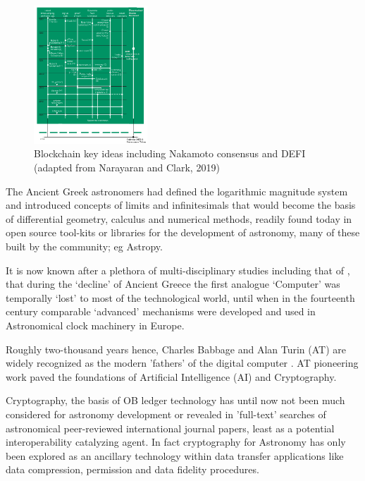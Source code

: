 \documentclass[final,5p,times,twocolumn,authoryear]{elsarticle}
\begin{document}
 \begin{figure}
    \centering
    \includegraphics[width=0.38\textwidth]{narayanan3.png}
    \vspace*{-0.3cm}
    \caption{Blockchain key ideas including Nakamoto consensus and DEFI (adapted from Narayaran and Clark, 2019)}
    \label{fig:narayanan}
\end{figure}
 
 The Ancient Greek astronomers had defined the logarithmic magnitude system and introduced concepts of limits and infinitesimals that would become the basis of differential geometry, calculus and numerical methods, readily found today in open source tool-kits or  libraries for the development of astronomy, many of these built by the community; eg Astropy.
 
 It is now known after a plethora of multi-disciplinary studies including that of \citet{Freeth2021}, that during the `decline' of Ancient Greece the first analogue `Computer' was temporally `lost' to most of the technological world, until when in the fourteenth century comparable `advanced' mechanisms were developed and used in Astronomical clock machinery in Europe. 
 
 Roughly two-thousand years hence, Charles Babbage and Alan Turin (AT) are widely recognized as the modern 'fathers' of the digital computer \citet{swa2017}. AT pioneering  work paved the foundations of Artificial Intelligence (AI) and Cryptography. 
 
Cryptography, the basis of OB ledger technology has until now not been much considered for astronomy development or revealed in 'full-text' searches of astronomical peer-reviewed international journal papers, least as a potential interoperability catalyzing agent. In fact cryptography for Astronomy has only been explored as an ancillary technology within data transfer applications like data compression, permission and data fidelity procedures.
\end{document}
